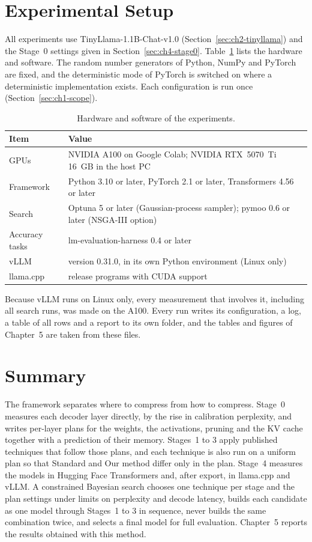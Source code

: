 \documentclass[
11pt, %
english, %
singlespacing, %
headsepline, %
]{MastersDoctoralThesis} %
\begin{document}
\section{Experimental Setup}
\label{sec:ch4-setup}

All experiments use TinyLlama-1.1B-Chat-v1.0 (Section~\ref{sec:ch2-tinyllama}) and the Stage~0 settings given in Section~\ref{sec:ch4-stage0}. Table~\ref{tab:ch4-setup} lists the hardware and software. The random number generators of Python, NumPy and PyTorch are fixed, and the deterministic mode of PyTorch is switched on where a deterministic implementation exists. Each configuration is run once (Section~\ref{sec:ch1-scope}).

\begin{table}[htbp]
\centering
\small
\caption{Hardware and software of the experiments.}
\label{tab:ch4-setup}
\renewcommand{\arraystretch}{1.2}
\begin{tabularx}{\textwidth}{lX}
\hline
\textbf{Item} & \textbf{Value} \\
\hline
GPUs & NVIDIA A100 on Google Colab; NVIDIA RTX~5070~Ti 16~GB in the host PC \\
Framework & Python 3.10 or later, PyTorch 2.1 or later, Transformers 4.56 or later \\
Search & Optuna 5 or later (Gaussian-process sampler); pymoo 0.6 or later (NSGA-III option) \\
Accuracy tasks & lm-evaluation-harness 0.4 or later \\
vLLM & version 0.31.0, in its own Python environment (Linux only) \\
llama.cpp & release programs with CUDA support \\
\hline
\end{tabularx}
\end{table}

Because vLLM runs on Linux only, every measurement that involves it, including all search runs, was made on the A100. Every run writes its configuration, a log, a table of all rows and a report to its own folder, and the tables and figures of Chapter~5 are taken from these files.

\section{Summary}
\label{sec:ch4-summary}

The framework separates where to compress from how to compress. Stage~0 measures each decoder layer directly, by the rise in calibration perplexity, and writes per-layer plans for the weights, the activations, pruning and the KV cache together with a prediction of their memory. Stages~1 to 3 apply published techniques that follow those plans, and each technique is also run on a uniform plan so that Standard and Our method differ only in the plan. Stage~4 measures the models in Hugging Face Transformers and, after export, in llama.cpp and vLLM. A constrained Bayesian search chooses one technique per stage and the plan settings under limits on perplexity and decode latency, builds each candidate as one model through Stages~1 to 3 in sequence, never builds the same combination twice, and selects a final model for full evaluation. Chapter~5 reports the results obtained with this method.
\clearpage
\end{document}

